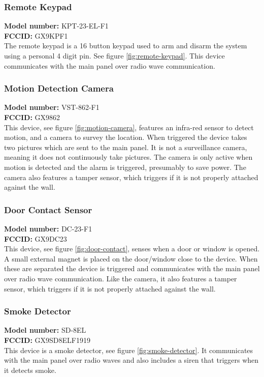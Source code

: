 \subsubsection{Remote Keypad}
\textbf{Model number:} KPT-23-EL-F1 \\ %
\textbf{FCCID:} GX9KPF1 \\ %
The remote keypad is a 16 button keypad used to arm and disarm the system using a personal 4 digit pin. See figure \ref{fig:remote-keypad}. This device communicates with the main panel over radio wave communication.

\subsubsection{Motion Detection Camera}
\textbf{Model number:} VST-862-F1 \\
\textbf{FCCID:} GX9862 \\
This device, see figure \ref{fig:motion-camera}, features an infra-red sensor to detect motion, and a camera to survey the location. When triggered the device takes two pictures which are sent to the main panel. It is not a surveillance camera, meaning it does not continuously take pictures. The camera is only active when motion is detected and the alarm is triggered, presumably to save power. The camera also features a tamper sensor, which triggers if it is not properly attached against the wall.

\subsubsection{Door Contact Sensor}
\textbf{Model number:} DC-23-F1 \\
\textbf{FCCID:} GX9DC23 \\
This device, see figure \ref{fig:door-contact}, senses when a door or window is opened. A small external magnet is placed on the door/window close to the device. When these are separated the device is triggered and communicates with the main panel over radio wave communication. Like the camera, it also features a tamper sensor, which triggers if it is not properly attached against the wall.

\subsubsection{Smoke Detector}
\textbf{Model number:} SD-8EL \\
\textbf{FCCID:} GX9SD8ELF1919 \\
This device is a smoke detector, see figure \ref{fig:smoke-detector}. It communicates with the main panel over radio waves and also includes a siren that triggers when it detects smoke.

